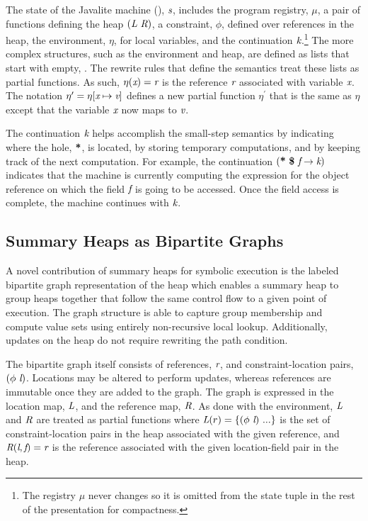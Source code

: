 The state of the Javalite machine (),
$\emph{s}$, includes the program registry, $\mu$, a pair of functions defining the heap
$(\emph{L}\ \emph{R})$, a constraint,
$\phi$, defined over references in the heap, the environment, $\eta$,
for local variables, and the continuation $\emph{k}$.\footnote{The registry $\mu$ never changes so it is omitted from the state tuple in the rest of the presentation for compactness.}  The more
complex structures, such as the environment and heap, are defined as lists that
start with empty, . The rewrite rules that define the
semantics treat these lists as partial functions. As such,
$\eta(\emph{x}) = \emph{r}$ is the reference $\emph{r}$ associated with variable
$\emph{x}$. The notation $\eta^\prime = \eta[\emph{x} \mapsto
  \emph{v}]$ defines a new partial function $\eta^\prime$ that is
the same as $\eta$ except that the variable $\emph{x}$ now maps to
$\emph{v}$.

The continuation $\emph{k}$ helps accomplish the small-step semantics
by indicating where the hole, $\textbf{*}$, is located, by storing
temporary computations, and by keeping track of the next
computation. For example, the continuation
$\lp\cfgt{*}\ \cfgt{\$}\ \cfgnt{f} \rightarrow \cfgnt{k}\rp$ indicates
that the machine is currently computing the expression for the object
reference on which the field $\emph{f}$ is going to be accessed. Once
the field access is complete, the machine continues with $\emph{k}$.

\subsection{Summary Heaps as Bipartite Graphs}
A novel contribution of summary heaps for symbolic execution is the
labeled bipartite graph representation of the heap which enables a
summary heap to group heaps together that follow the same control flow
to a given point of execution. The graph structure is able to capture
group membership and compute value sets using entirely non-recursive
local lookup. Additionally, updates on the heap do not require
rewriting the path condition.

The bipartite graph itself consists of references, $\emph{r}$, and
constraint-location pairs, $(\phi\ \emph{l})$. Locations may be 
altered to perform updates, whereas references are immutable
once they are added to the graph. The graph is
expressed in the location map, $\emph{L}$, and the reference map,
$\emph{R}$. As done with the environment, $\emph{L}$ and $\emph{R}$
are treated as partial functions where $\emph{L}(r) =
\{(\phi\ \emph{l})\ ...\}$ is the set of constraint-location pairs in
the heap associated with the given reference, and
$\emph{R}(\emph{l},\emph{f}) = \emph{r}$ is the reference
associated with the given location-field pair in the heap.  

